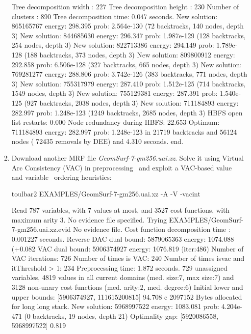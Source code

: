 \begin{enumerate}
{\begin{DoxyCode}
Tree decomposition width  : 227
Tree decomposition height : 230
Number of clusters        : 890
Tree decomposition time: 0.047 seconds.
New solution: 865165767 energy: 298.395 prob: 2.564e-130 (72 backtracks, 140 nodes, depth 3)
New solution: 844685630 energy: 296.347 prob: 1.987e-129 (128 backtracks, 254 nodes, depth 3)
New solution: 822713386 energy: 294.149 prob: 1.789e-128 (188 backtracks, 373 nodes, depth 3)
New solution: 809800912 energy: 292.858 prob: 6.506e-128 (327 backtracks, 665 nodes, depth 3)
New solution: 769281277 energy: 288.806 prob: 3.742e-126 (383 backtracks, 771 nodes, depth 3)
New solution: 755317979 energy: 287.410 prob: 1.512e-125 (714 backtracks, 1549 nodes, depth 3)
New solution: 755129381 energy: 287.391 prob: 1.540e-125 (927 backtracks, 2038 nodes, depth 3)
New solution: 711184893 energy: 282.997 prob: 1.248e-123 (1249 backtracks, 2685 nodes, depth 3)
HBFS open list restarts: 0.000 %
Node redundancy during HBFS: 22.653 %
Optimum: 711184893 energy: 282.997 prob: 1.248e-123 in 21719 backtracks and 56124 nodes ( 72435 removals by DEE) and 4.310 seconds.
end.
\end{DoxyCode}}
\item Download another MRF file {\em GeomSurf-7-gm256.uai.xz}. Solve it using Virtual Arc Consistency (VAC) in preprocessing~\cite{Cooper08} and exploit a VAC-based value~\cite{Cooper10a} and variable~\cite{Trosser20a} ordering heuristics:
\begin{DoxyCode}
	toulbar2 EXAMPLES/GeomSurf-7-gm256.uai.xz -A -V -vacint
\end{DoxyCode}
{\scriptsize
\begin{DoxyCode}
Read 787 variables, with 7 values at most, and 3527 cost functions, with maximum arity 3.
No evidence file specified. Trying EXAMPLES/GeomSurf-7-gm256.uai.xz.evid
No evidence file. 
Cost function decomposition time : 0.001227 seconds.
Reverse DAC dual bound: 5879065363 energy: 1074.088 (+0.082%
VAC dual bound: 5906374927 energy: 1076.819 (iter:486)
Number of VAC iterations: 726
Number of times is VAC: 240 Number of times isvac and itThreshold > 1: 234
Preprocessing time: 1.872 seconds.
729 unassigned variables, 4819 values in all current domains (med. size:7, max size:7) and 3128 non-unary cost functions (med. arity:2, med. degree:6)
Initial lower and upper bounds: [5906374927, 111615200815] 94.708%
c 2097152 Bytes allocated for long long stack.
New solution: 5968997522 energy: 1083.081 prob: 4.204e-471 (0 backtracks, 19 nodes, depth 21)
Optimality gap: [5920086558, 5968997522] 0.819 %

\end{DoxyCode}}
\end{enumerate}
